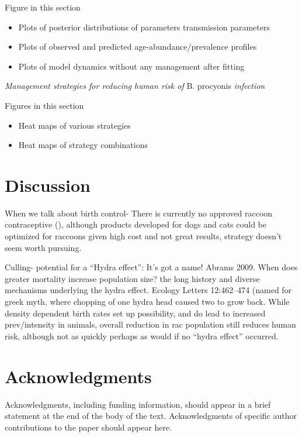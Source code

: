 \documentclass[11pt]{article}
\begin{document}
Figure in this section

\begin{itemize}
\item
  Plots of posterior distributions of parameters transmission parameters
\item
  Plots of observed and predicted age-abundance/prevalence profiles
\item
  Plots of model dynamics without any management after fitting
\end{itemize}

\emph{Management strategies for reducing} \emph{human risk of} B.
procyonis \emph{infection}

Figures in this section

\begin{itemize}
\item
  Heat maps of various strategies
\item
  Heat maps of strategy combinations
\end{itemize}

\section{Discussion}

When we talk about birth control- There is currently no approved raccoon
contraceptive (), although products developed for dogs and cats could be
optimized for raccoons given high cost and not great results, strategy
doesn't seem worth pursuing.

Culling- potential for a ``Hydra effect'': It's got a name! Abrams 2009.
When does greater mortality increase population size? the long history
and diverse mechanisms underlying the hydra effect. Ecology Letters
12:462--474 (named for greek myth, where chopping of one hydra head
caused two to grow back. While density dependent birth rates set up
possibility, and do lead to increased prev/intensity in animals, overall
reduction in rac population still reduces human risk, although not as
quickly perhaps as would if no ``hydra effect'' occurred.

\section{Acknowledgments} 

Acknowledgments, including funding
information, should appear in a brief statement at the end of the body
of the text. Acknowledgments of specific author contributions to the
paper should appear here.
\end{document}
